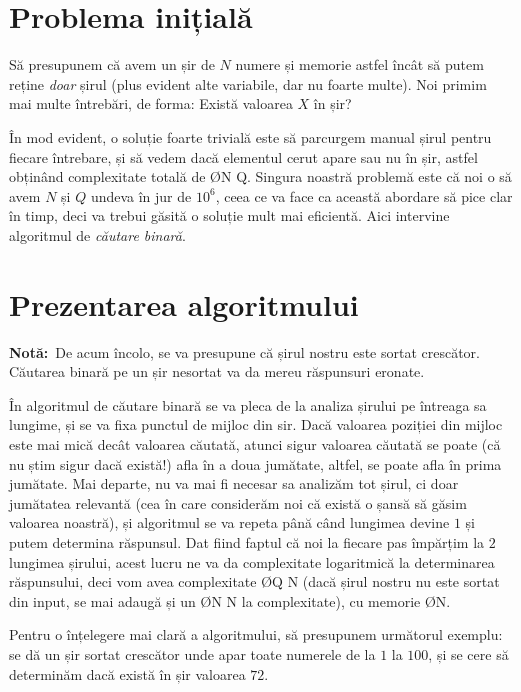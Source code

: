  

\section{Problema inițială}
Să presupunem că avem un șir de $N$ numere și memorie astfel încât să putem reține \textit{doar} șirul (plus evident alte variabile, dar nu foarte multe). Noi primim mai multe întrebări, de forma: Există valoarea $X$ în șir?

În mod evident, o soluție foarte trivială este să parcurgem manual șirul pentru fiecare întrebare, și să vedem dacă elementul cerut apare sau nu în șir, astfel obținând complexitate totală de \O{N \cdot Q}. Singura noastră problemă este că noi o să avem $N$ și $Q$ undeva în jur de $10^6$, ceea ce va face ca această abordare să pice clar în timp, deci va trebui găsită o soluție mult mai eficientă. Aici intervine algoritmul de \textit{căutare binară}.

\section{Prezentarea algoritmului}
\textbf{Notă:}\ De acum încolo, se va presupune că șirul nostru este sortat crescător. Căutarea binară pe un șir nesortat va da mereu răspunsuri eronate.

În algoritmul de căutare binară se va pleca de la analiza șirului pe întreaga sa lungime, și se va fixa punctul de mijloc din sir. Dacă valoarea poziției din mijloc este mai mică decât valoarea căutată, atunci sigur valoarea căutată se poate (că nu știm sigur dacă există!) afla în a doua jumătate, altfel, se poate afla în prima jumătate. Mai departe, nu va mai fi necesar sa analizăm tot șirul, ci doar jumătatea relevantă (cea în care considerăm noi că există o șansă să găsim valoarea noastră), și algoritmul se va repeta până când lungimea devine $1$ și putem determina răspunsul. Dat fiind faptul că noi la fiecare pas împărțim la $2$ lungimea șirului, acest lucru ne va da complexitate logaritmică la determinarea răspunsului, deci vom avea complexitate \O{Q \log N} (dacă șirul nostru nu este sortat din input, se mai adaugă și un \O{N \log N} la complexitate), cu memorie \O{N}.

Pentru o înțelegere mai clară a algoritmului, să presupunem următorul exemplu: se dă un șir sortat crescător unde apar toate numerele de la $1$ la $100$, și se cere să determinăm dacă există în șir valoarea $72$.

